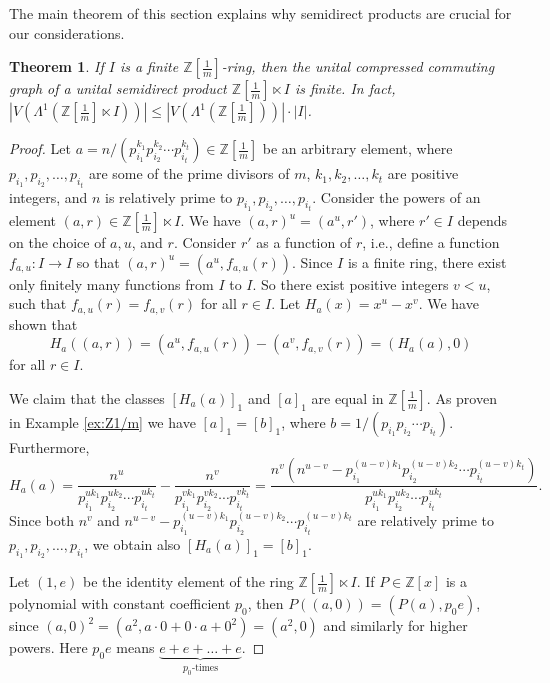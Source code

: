 \documentclass[12pt,a4paper]{amsart}
\newtheorem{theorem}[proposition]{Theorem}
\theoremstyle{definition}
\newcommand{\Z}{\mathbb{Z}}
\begin{document}
The main theorem of this section explains why semidirect products are crucial for our considerations. 

\begin{theorem}\label{thm:inf_ring_2}
    If $I$ is a finite $\Z[\frac1m]$-ring, then the unital compressed commuting graph of a unital semidirect product $\Z[\frac1m] \ltimes I$ is finite. In fact, $|V(\Lambda^1(\Z[\frac1m] \ltimes I))| \le |V(\Lambda^1(\Z[\frac1m]))| \cdot |I|$.
\end{theorem}

\begin{proof}
Let $a = n/(p_{i_1}^{k_1}p_{i_2}^{k_2}\cdots p_{i_t}^{k_t}) \in \Z[\frac1m]$ be an arbitrary element, where $p_{i_1}, p_{i_2}, \ldots, p_{i_t}$ are some of the prime divisors of $m$, $k_1, k_2, \ldots, k_t$ are positive integers, and $n$ is relatively prime to $p_{i_1}, p_{i_2}, \ldots, p_{i_t}$. Consider the powers of an element $(a,r) \in \Z[\frac1m] \ltimes I$. We have $(a,r)^u = (a^u, r')$, where $r' \in I$ depends on the choice of $a, u$, and $r$. Consider $r'$ as a function of $r$, i.e., define a function $f_{a,u}\colon I \to I$ so that $(a,r)^u = (a^u, f_{a,u}(r))$. Since $I$ is a finite ring, there exist only finitely many functions from $I$ to $I$. So there exist positive integers $v < u$, such that $f_{a,u}(r) = f_{a,v}(r)$ for all $r \in I$.
Let $H_a(x) = x^u - x^v$. We have shown that 
$$H_a((a,r)) = (a^u, f_{a,u}(r)) - (a^v, f_{a,v}(r)) = (H_a(a),0)$$
for all $r \in I$.

We claim that the classes $[H_a(a)]_1$ and $[a]_1$ are equal in $\Z[\frac1m]$. As proven in Example \ref{ex:Z1/m} we have $[a]_1 = [b]_1$, where $b = 1/(p_{i_1}p_{i_2}\cdots p_{i_t})$.
Furthermore, 
$$H_a(a) = \frac{n^u}{p_{i_1}^{uk_1}p_{i_2}^{uk_2}\cdots p_{i_t}^{uk_t}} - \frac{n^v}{p_{i_1}^{vk_1}p_{i_2}^{vk_2}\cdots p_{i_t}^{vk_t}} =
\frac{n^v(n^{u-v} - p_{i_1}^{(u-v)k_1}p_{i_2}^{(u-v)k_2}\cdots p_{i_t}^{(u-v)k_t})}{p_{i_1}^{uk_1}p_{i_2}^{uk_2}\cdots p_{i_t}^{uk_t}}.$$
Since both $n^v$ and $n^{u-v} - p_{i_1}^{(u-v)k_1}p_{i_2}^{(u-v)k_2}\cdots p_{i_t}^{(u-v)k_t}$ are relatively prime to $p_{i_1}, p_{i_2}, \ldots, p_{i_t}$, we obtain also $[H_a(a)]_1 = [b]_1$.

Let $(1,e)$ be the identity element of the ring $\Z[\frac1m] \ltimes I$. If $P \in \Z[x]$ is a polynomial with constant coefficient $p_0$, then $P((a,0)) = (P(a), p_0e)$, since $(a,0)^2 = (a^2, a \cdot 0 + 0 \cdot a + 0^2) = (a^2, 0)$ and similarly for higher powers. Here $p_0e$ means $\underbrace{e + e + \ldots + e}_{p_0\text{-times}}$.


\end{proof}
\end{document}
